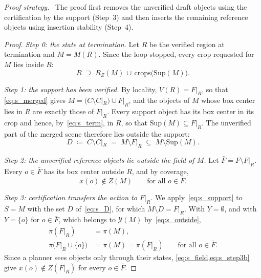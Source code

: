 \documentclass[10pt,letterpaper]{article}
\newcommand{\draft}{C}
\newcommand{\full}{F}
\newcommand{\merged}{M}
\newcommand{\Sup}{\mathrm{Sup}}
\newcommand{\field}{Z}
\newcommand{\foot}{R_{\field}}
\newcommand{\policy}{\pi}
\theoremstyle{remark}
\theoremstyle{plain}
\theoremstyle{definition}
\newenvironment{strategy}{\par\noindent\textit{Proof strategy.}\ }{\par}
\begin{document}
\begin{strategy}
The proof first removes the unverified draft objects using the certification by the support (Step~3) and then inserts the remaining reference objects using insertion stability (Step~4).
\end{strategy}

\begin{proof}
\emph{Step 0: the state at termination.}
Let $R$ be the verified region at termination and $\merged=\merged(R)$.
Since the loop stopped, every crop requested for $\merged$ lies inside $R$:
\begin{equation}
R\;\supseteq\;\foot(\merged)\,\cup\,\mathrm{crops}\big(\Sup(\merged)\big).
\label{eq:s_term}
\end{equation}

\emph{Step 1: the support has been verified.}
By locality, $V(R)=\full|_R$, so that \cref{eq:s_merged} gives $\merged=(\draft\setminus\draft|_R)\cup\full|_R$, and the objects of $\merged$ whose box center lies in $R$ are exactly those of $\full|_R$.
Every support object has its box center in its crop and hence, by~\cref{eq:s_term}, in $R$, so that $\Sup(\merged)\subseteq\full|_R$.
The unverified part of the merged scene therefore lies outside the support:
\begin{equation}
D\;\coloneqq\;\draft\setminus\draft|_R\;=\;\merged\setminus\full|_R\;\subseteq\;\merged\setminus\Sup(\merged).
\label{eq:s_D}
\end{equation}

\emph{Step 2: the unverified reference objects lie outside the field of $\merged$.}
Let $\bar\full=\full\setminus\full|_R$.
Every $o\in\bar\full$ has its box center outside $R$, and by coverage,
\begin{equation}
x(o)\notin\field(\merged)\qquad\text{for all } o\in\bar\full .
\label{eq:s_outside}
\end{equation}

\emph{Step 3: certification transfers the action to $\full|_R$.}
We apply~\cref{eq:s_support} to $S=\merged$ with the set $D$ of~\cref{eq:s_D}, for which $\merged\setminus D=\full|_R$.
With $Y=\emptyset$, and with $Y=\{o\}$ for $o\in\bar\full$, which belongs to $\mathcal{Y}(\merged)$ by~\cref{eq:s_outside},
\begin{align}
\policy(\full|_R)&=\policy(\merged),\label{eq:s_step3a}\\
\policy\big(\full|_R\cup\{o\}\big)&=\policy(\merged)=\policy(\full|_R)\qquad\text{for all } o\in\bar\full .\label{eq:s_step3b}
\end{align}
Since a planner sees objects only through their states, \cref{eq:s_field,eq:s_step3b} give $x(o)\notin\field(\full|_R)$ for every $o\in\bar\full$.


\end{proof}
\end{document}
